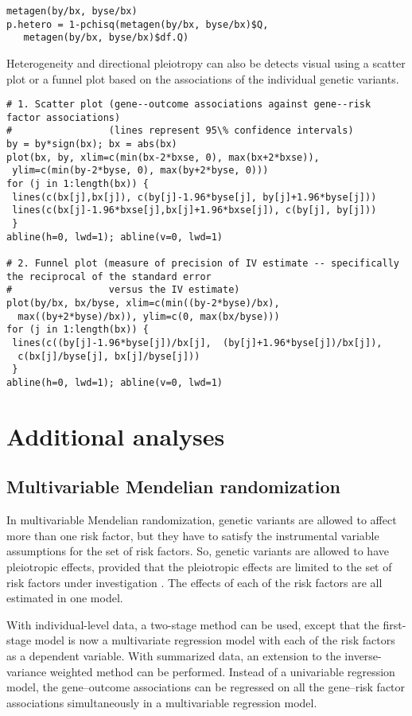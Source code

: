 \documentclass[a4paper,12pt]{article} %
\begin{document}
\begin{lstlisting}
metagen(by/bx, byse/bx)
p.hetero = 1-pchisq(metagen(by/bx, byse/bx)$Q,
   metagen(by/bx, byse/bx)$df.Q)
\end{lstlisting}

Heterogeneity and directional pleiotropy can also be detects visual using a scatter plot or a funnel plot based on the associations of the individual genetic variants.

\begin{lstlisting}
# 1. Scatter plot (gene--outcome associations against gene--risk factor associations)
#                 (lines represent 95\% confidence intervals)
by = by*sign(bx); bx = abs(bx)
plot(bx, by, xlim=c(min(bx-2*bxse, 0), max(bx+2*bxse)),
 ylim=c(min(by-2*byse, 0), max(by+2*byse, 0)))
for (j in 1:length(bx)) {
 lines(c(bx[j],bx[j]), c(by[j]-1.96*byse[j], by[j]+1.96*byse[j]))
 lines(c(bx[j]-1.96*bxse[j],bx[j]+1.96*bxse[j]), c(by[j], by[j]))
 }
abline(h=0, lwd=1); abline(v=0, lwd=1)

# 2. Funnel plot (measure of precision of IV estimate -- specifically the reciprocal of the standard error
#                 versus the IV estimate)
plot(by/bx, bx/byse, xlim=c(min((by-2*byse)/bx),
  max((by+2*byse)/bx)), ylim=c(0, max(bx/byse)))
for (j in 1:length(bx)) {
 lines(c((by[j]-1.96*byse[j])/bx[j],  (by[j]+1.96*byse[j])/bx[j]),
  c(bx[j]/byse[j], bx[j]/byse[j]))
 }
abline(h=0, lwd=1); abline(v=0, lwd=1)
\end{lstlisting}

\clearpage

\section{Additional analyses}
\subsection{Multivariable Mendelian randomization}
In multivariable Mendelian randomization, genetic variants are allowed to affect more than one risk factor, but they have to satisfy the instrumental variable assumptions for the set of risk factors. So, genetic variants are allowed to have pleiotropic effects, provided that the pleiotropic effects are limited to the set of risk factors under investigation \citep{burgess2014pleioaje}. The effects of each of the risk factors are all estimated in one model.

With individual-level data, a two-stage method can be used, except that the first-stage model is now a multivariate regression model with each of the risk factors as a dependent variable. With summarized data, an extension to the inverse-variance weighted method can be performed. Instead of a univariable regression model, the gene--outcome associations can be regressed on all the gene--risk factor associations simultaneously in a multivariable regression model.
\end{document}
